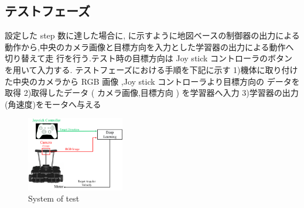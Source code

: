 \documentclass[10pt]{jarticle}
\begin{document}
    \subsection{テストフェーズ}
    設定した step 数に達した場合に, に示すように地図ベースの制御器の出力による
    動作から,中央のカメラ画像と目標方向を入力とした学習器の出力による動作へ切り替えて走
    行を行う.テスト時の目標方向は Joy stick コントローラのボタンを用いて入力する.
    テストフェーズにおける手順を下記に示す
    1)機体に取り付けた中央のカメラから RGB 画像 ,Joy stick コントローラより目標方向の
    データを取得
    2)取得したデータ ( カメラ画像,目標方向 ) を学習器へ入力
    3)学習器の出力(角速度)をモータへ与える
    \begin{center}
        \begin{figure}[h]
            \centering
            \includegraphics[width=0.38\textwidth]{./fig/system_test.pdf}
            \caption{System of test}
            \label{fig:system_test}
        \end{figure}
    \end{center}
    
\end{document}
